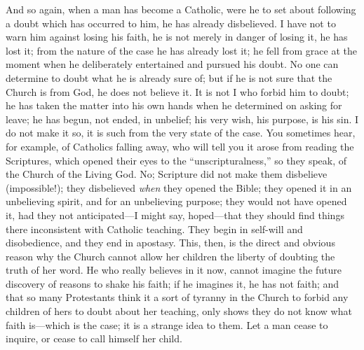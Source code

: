And so again, when a man has become a Catholic, were he to set
about following a doubt which has occurred to him, he has already
disbelieved. I have not to warn him against losing his faith, he is
not merely in danger of losing it, he has lost it; from the nature of
the case he has already lost it; he fell from grace at the moment when
he deliberately entertained and pursued his doubt. No one can
determine to doubt what he is already sure of; but if he is not sure
that the Church is from God, he does not believe it. It is not I who
forbid him to doubt; he has taken the matter into his own hands when
he determined on asking for leave; he has begun, not ended, in
unbelief; his very wish, his purpose, is his sin. I do not make it so,
it is such from the very state of the case. You sometimes hear, for
example, of Catholics falling away, who will tell you it arose from
reading the Scriptures, which opened their eyes to the ``unscripturalness,''
so they speak, of the Church of the Living God. No; Scripture did not
make them disbelieve (impossible!); they disbelieved \emph{when} they
opened the Bible; they opened it in an unbelieving spirit, and for an
unbelieving purpose; they would not have opened it, had they not
anticipated—I might say, hoped—that they should find things there
inconsistent with Catholic teaching. They begin in self-will and
disobedience, and they end in apostasy. This, then, is the direct and
obvious reason why the Church cannot allow her children the liberty of
doubting the truth of her word. He who really believes in it now,
cannot imagine the future discovery of reasons to shake his faith; if
he imagines it, he has not faith; and that so many Protestants think
it a sort of tyranny in the Church to forbid any children of hers to
doubt about her teaching, only shows they do not know what faith is—which
is the case; it is a strange idea to them. Let a man cease to inquire,
or cease to call himself her child.

